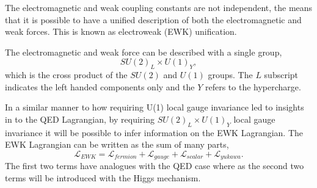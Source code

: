 The electromagnetic and weak coupling constants are not independent, the means that it is
possible to have a unified description of both the electromagnetic and weak
forces. This is known as electroweak (EWK) unification.

The electromagnetic and weak force can be described with a single group,
\begin{equation}
SU(2)_{L} \times U(1)_{Y},
\end{equation}
which is the cross product of the $SU(2)$ and $U(1)$ groups. The $L$ subscript
indicates the left handed components only and the $Y$ refers to the hypercharge.

In a similar manner to how requiring U(1) local gauge invariance led to insights
in to the QED Lagrangian, by requiring $SU(2)_{L} \times U(1)_{Y}$ local gauge
invariance it will be possible to infer information on the EWK Lagrangian.
The EWK Lagrangian can be written as the sum of many parts,
\begin{equation}
\mathcal{L}_{EWK} = 
\mathcal{L}_{fermion}
+ \mathcal{L}_{gauge}
+ \mathcal{L}_{scalar}
+ \mathcal{L}_{yukawa}.
\end{equation}
The first two terms have analogues with the QED case where as the second two
terms will be introduced with the Higgs mechanism.

